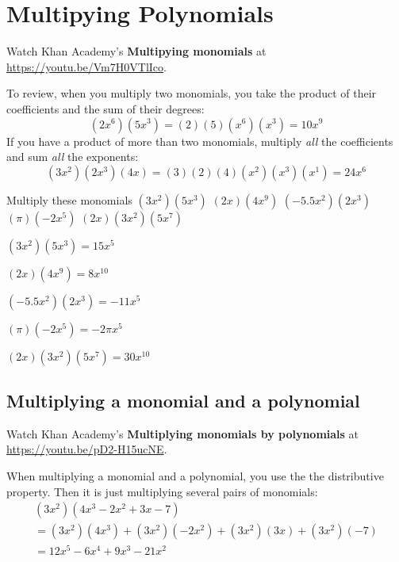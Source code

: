 \chapter{Multipying Polynomials}

Watch Khan Academy's \textbf{Multipying monomials} at \url{https://youtu.be/Vm7H0VTlIco}.

To review, when you multiply two monomials, you take the product of
their coefficients and the sum of their degrees:
\begin{equation*}
  (2x^6)(5x^3) = (2)(5)(x^6)(x^3) = 10x^9
\end{equation*}
If you have a product of more than two monomials, multiply \emph{all}
the coefficients and sum \emph{all} the exponents:
\begin{equation*}
  (3x^2)(2x^3)(4x) = (3)(2)(4)(x^2)(x^3)(x^1) = 24x^6
\end{equation*}

\begin{Exercise}[title={Multiplying monomials}, label=multmonomials]
Multiply these monomials
  \Question $(3x^2)(5x^3)$
\vspace{20mm}
  \Question $(2x)(4x^9)$
\vspace{20mm}
  \Question $(-5.5x^2)(2x^3)$
\vspace{20mm}
  \Question $(\pi)(-2x^5)$
\vspace{20mm}
  \Question $(2x)(3x^2)(5x^7)$
\vspace{20mm}
\end{Exercise}
\begin{Answer}[ref=multmonomials]
  $(3x^2)(5x^3) = 15x^5$
  
  $(2x)(4x^9) = 8x^{10}$
  
  $(-5.5x^2)(2x^3) = -11x^5$

  $(\pi)(-2x^5) = -2\pi x^5$
  
  $(2x)(3x^2)(5x^7) = 30x^{10}$
\end{Answer}

\section{Multiplying a monomial and a polynomial}

Watch Khan Academy's \textbf{Multiplying monomials by polynomials} at \url{https://youtu.be/pD2-H15ucNE}.

When multiplying a monomial and a polynomial, you use the the distributive property. Then it is just multiplying several pairs of monomials:
\begin{multline*}
  (3x^2)(4x^3 - 2x^2 + 3x - 7) \\
  = (3x^2)(4x^3) + (3x^2)(-2x^2) + (3x^2)(3x) + (3x^2)(-7) \\
  = 12x^5 - 6x^4 + 9x^3 -21x^2
\end{multline*}

